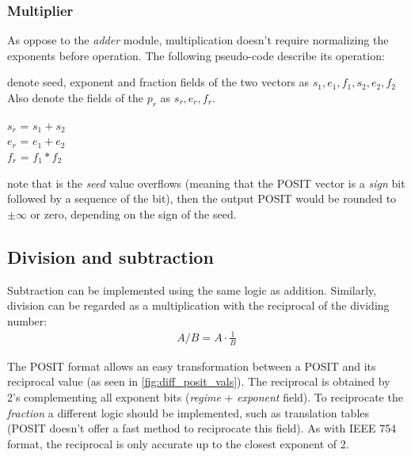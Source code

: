 \documentclass[10pt]{article}
\begin{document}

\subsubsection{Multiplier}\label{sec:multiplier}

As oppose to the \textit{adder} module, multiplication doesn't require
normalizing the exponents before operation. The following pseudo-code describe
its operation: \\
\begin{algorithm}[H]
 denote seed, exponent and fraction fields of the two vectors as
 $s_{1}, e_{1}, f_{1}, s_{2}, e_{2}, f_{2}$ \\
 Also denote the fields of the $p_{r}$ as $s_{r}, e_{r}, f_{r}$. \\

  {

   $s_{r}$ = $s_{1} + s_{2}$ \\
   $e_{r}$ = $e_{1} + e_{2}$ \\
   $f_{r}$ = $f_{1} * f_{2}$ \\
    }
  \end{algorithm}

\noindent note that is the \textit{seed} value overflows (meaning that the
POSIT vector is a \textit{sign} bit followed by a sequence of the bit), then the
output POSIT would be rounded to $\pm \infty$ or zero, depending on the sign of
the seed.

\subsection{Division and subtraction}\label{sec:division-subtraction}

Subtraction can be implemented using the same logic as addition. Similarly,
division can be regarded as a multiplication with the reciprocal of the dividing
number:
\begin{align*}
  A/B = A\cdot \frac{1}{B}
\end{align*}

\noindent The POSIT format allows an easy transformation between a POSIT and its
reciprocal value (as seen in \autoref{fig:diff_posit_vals}). The reciprocal is
obtained by 2's complementing all exponent bits (\textit{regime} +
\textit{exponent} field). To reciprocate the \textit{fraction} a different logic
should be implemented, such as translation tables (POSIT doesn't offer a fast
method to reciprocate this field).
As with IEEE 754 format, the reciprocal is only accurate up to the closest
exponent of 2.
\end{document}

